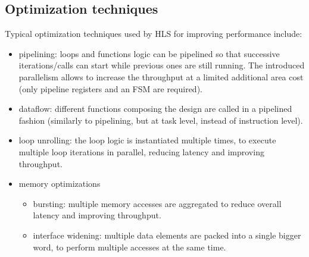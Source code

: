 \documentclass[11pt,a4paper]{memoir}
\begin{document}
\subsection{Optimization techniques}
Typical optimization techniques used by HLS for improving performance include:
\begin{itemize}
	\item pipelining: loops and functions logic can be pipelined so that
		successive iterations/calls can start while previous ones are
		still running. The introduced parallelism allows to increase
		the throughput at a limited additional area cost (only pipeline
		registers and an FSM are required).
	\item dataflow: different functions composing the design are called in
		a pipelined fashion (similarly to pipelining, but at task level,
		instead of instruction level).
	\item loop unrolling: the loop logic is instantiated multiple times,
		to execute multiple loop iterations in parallel, reducing latency
		and improving throughput.
	\item memory optimizations
		\begin{itemize}
			\item bursting: multiple memory accesses are aggregated
				to reduce overall latency and improving throughput.
			\item interface widening: multiple data elements are
				packed into a single bigger word, to perform
				multiple accesses at the same time.
		\end{itemize}
\end{itemize}

\end{document}
